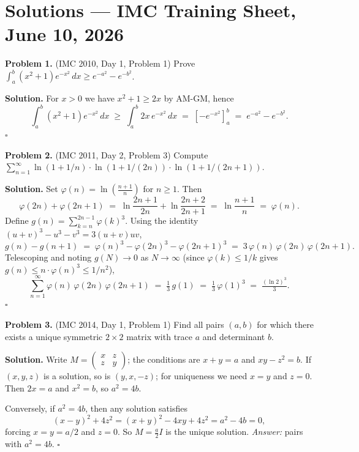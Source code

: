 \documentclass{article}
\begin{document}
\pagestyle{plain}

\section*{Solutions --- IMC Training Sheet, June 10, 2026}

\textbf{Problem 1.} (IMC 2010, Day 1, Problem 1)
Prove \( \int_a^b (x^2 + 1) e^{-x^2}\, dx \geq e^{-a^2} - e^{-b^2} \).

\textbf{Solution.}
For \( x > 0 \) we have \( x^2 + 1 \geq 2x \) by AM-GM, hence
\[
\int_a^b (x^2 + 1) e^{-x^2}\, dx \;\geq\; \int_a^b 2x\, e^{-x^2}\, dx \;=\; \left[ -e^{-x^2} \right]_a^b \;=\; e^{-a^2} - e^{-b^2}.
\]
\hfill\(\square\)

\bigskip
\textbf{Problem 2.} (IMC 2011, Day 2, Problem 3)
Compute \( \sum_{n=1}^{\infty} \ln(1 + 1/n) \cdot \ln(1 + 1/(2n)) \cdot \ln(1 + 1/(2n+1)) \).

\textbf{Solution.}
Set \( \varphi(n) = \ln\!\left(\frac{n+1}{n}\right) \) for \( n \geq 1 \). Then
\[
\varphi(2n) + \varphi(2n+1) \;=\; \ln\frac{2n+1}{2n} + \ln\frac{2n+2}{2n+1} \;=\; \ln\frac{n+1}{n} \;=\; \varphi(n).
\]
Define \( g(n) = \sum_{k=n}^{2n-1} \varphi(k)^3 \). Using the identity \( (u+v)^3 - u^3 - v^3 = 3(u+v)uv \),
\[
g(n) - g(n+1) \;=\; \varphi(n)^3 - \varphi(2n)^3 - \varphi(2n+1)^3 \;=\; 3\,\varphi(n)\,\varphi(2n)\,\varphi(2n+1).
\]
Telescoping and noting \( g(N) \to 0 \) as \( N \to \infty \) (since \( \varphi(k) \leq 1/k \) gives \( g(n) \leq n \cdot \varphi(n)^3 \leq 1/n^2 \)),
\[
\sum_{n=1}^{\infty} \varphi(n)\,\varphi(2n)\,\varphi(2n+1) \;=\; \tfrac{1}{3}\, g(1) \;=\; \tfrac{1}{3}\, \varphi(1)^3 \;=\; \tfrac{(\ln 2)^3}{3}.
\]
\hfill\(\square\)

\bigskip
\textbf{Problem 3.} (IMC 2014, Day 1, Problem 1)
Find all pairs \( (a, b) \) for which there exists a unique symmetric \( 2 \times 2 \) matrix with trace \( a \) and determinant \( b \).

\textbf{Solution.}
Write \( M = \begin{pmatrix} x & z \\ z & y \end{pmatrix} \); the conditions are \( x + y = a \) and \( xy - z^2 = b \). If \( (x, y, z) \) is a solution, so is \( (y, x, -z) \); for uniqueness we need \( x = y \) and \( z = 0 \). Then \( 2x = a \) and \( x^2 = b \), so \( a^2 = 4b \).

Conversely, if \( a^2 = 4b \), then any solution satisfies
\[
(x - y)^2 + 4z^2 = (x + y)^2 - 4xy + 4z^2 = a^2 - 4b = 0,
\]
forcing \( x = y = a/2 \) and \( z = 0 \). So \( M = \tfrac{a}{2} I \) is the unique solution. \emph{Answer:} pairs with \( a^2 = 4b \). \hfill\(\square\)
\end{document}
